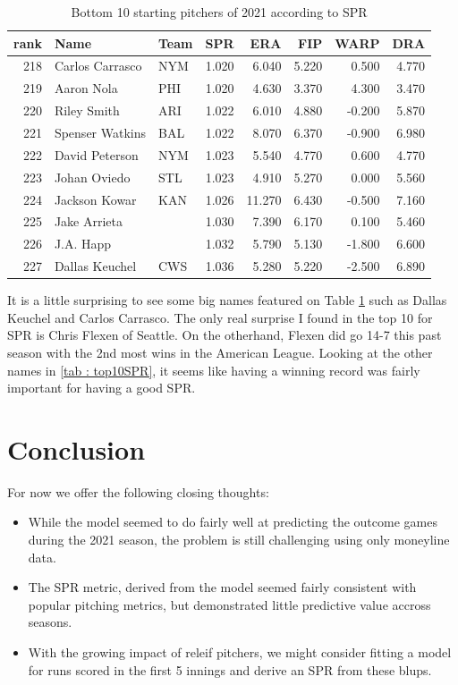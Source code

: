 \documentclass [52pt] {article}
\begin{document}
\begin{table}[ht]
    \centering
    \begin{tabular}{rllrrrrr}
     \hline
 rank & Name & Team & SPR & ERA & FIP & WARP & DRA \\ 
  \hline
  218 & Carlos Carrasco & NYM & 1.020 & 6.040 & 5.220 & 0.500 & 4.770 \\ 
  219 & Aaron Nola & PHI & 1.020 & 4.630 & 3.370 & 4.300 & 3.470 \\ 
  220 & Riley Smith & ARI & 1.022 & 6.010 & 4.880 & -0.200 & 5.870 \\ 
  221 & Spenser Watkins & BAL & 1.022 & 8.070 & 6.370 & -0.900 & 6.980 \\ 
  222 & David Peterson & NYM & 1.023 & 5.540 & 4.770 & 0.600 & 4.770 \\ 
  223 & Johan Oviedo & STL & 1.023 & 4.910 & 5.270 & 0.000 & 5.560 \\ 
  224 & Jackson Kowar & KAN & 1.026 & 11.270 & 6.430 & -0.500 & 7.160 \\ 
  225 & Jake Arrieta &  & 1.030 & 7.390 & 6.170 & 0.100 & 5.460 \\ 
  226 & J.A. Happ &  & 1.032 & 5.790 & 5.130 & -1.800 & 6.600 \\ 
  227 & Dallas Keuchel & CWS & 1.036 & 5.280 & 5.220 & -2.500 & 6.890 \\ 
   \hline
\end{tabular}
\caption{Bottom 10 starting pitchers of 2021 according to SPR}
\label{tab : bottom10SPR}
\end{table}

It is a little surprising to see some big names featured on Table \ref{tab : bottom10SPR} such as Dallas Keuchel and Carlos Carrasco.  The only real surprise I found in the top 10 for SPR is Chris Flexen of Seattle.  On the otherhand, Flexen did go 14-7 this past season with the 2nd most wins in the American League.  Looking at the other names in \ref{tab : top10SPR}, it seems like having a winning record was fairly important for having a good SPR.  

\section{Conclusion}
For now we offer the following closing thoughts:

 \begin{itemize}
        \item While the model seemed to do fairly well at predicting the outcome games during the 2021 season, the problem is still challenging using only moneyline data.
        \item The SPR metric, derived from the model seemed fairly consistent with popular pitching metrics, but demonstrated little predictive value accross seasons.
        \item With the growing impact of releif pitchers, we might consider fitting a model for runs scored in the first 5 innings and derive an SPR from these blups.
    \end{itemize}
\end{document}
